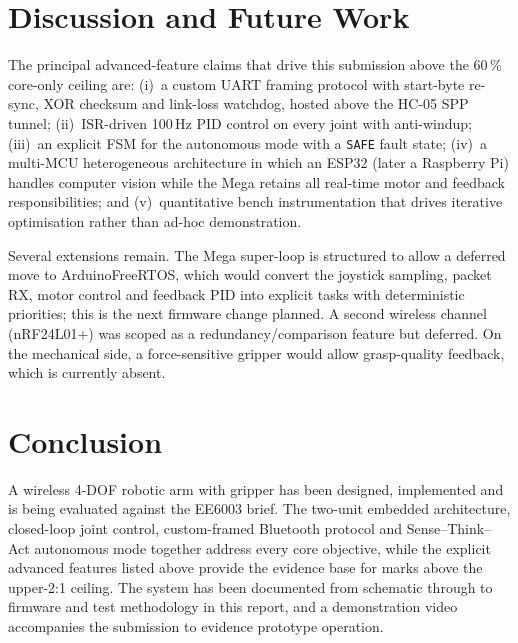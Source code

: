 \section{Discussion and Future Work}
\label{sec:futurework}

The principal advanced-feature claims that drive this submission
above the 60\,\% core-only ceiling are: (i)~a custom UART framing
protocol with start-byte re-sync, XOR checksum and link-loss
watchdog, hosted above the HC-05 SPP tunnel; (ii)~ISR-driven 100\,Hz
PID control on every joint with anti-windup; (iii)~an explicit FSM
for the autonomous mode with a \texttt{SAFE} fault state;
(iv)~a multi-MCU heterogeneous architecture in which an ESP32 (later
a Raspberry Pi) handles computer vision while the Mega retains all
real-time motor and feedback responsibilities; and (v)~quantitative
bench instrumentation that drives iterative optimisation rather than
ad-hoc demonstration.

Several extensions remain. The Mega super-loop is structured to
allow a deferred move to ArduinoFreeRTOS, which would convert the
joystick sampling, packet RX, motor control and feedback PID into
explicit tasks with deterministic priorities; this is the next
firmware change planned. A second wireless channel
(\mbox{nRF24L01+}) was scoped as a redundancy/comparison feature but
deferred. On the mechanical side, a force-sensitive gripper would
allow grasp-quality feedback, which is currently absent.

\section{Conclusion}
\label{sec:conclusion}

A wireless 4-DOF robotic arm with gripper has been designed,
implemented and is being evaluated against the EE6003 brief. The
two-unit embedded architecture, closed-loop joint control,
custom-framed Bluetooth protocol and Sense--Think--Act autonomous
mode together address every core objective, while the explicit
advanced features listed above provide the evidence base for marks
above the upper-2:1 ceiling. The system has been documented from
schematic through to firmware and test methodology in this report,
and a demonstration video accompanies the submission to evidence
prototype operation.
